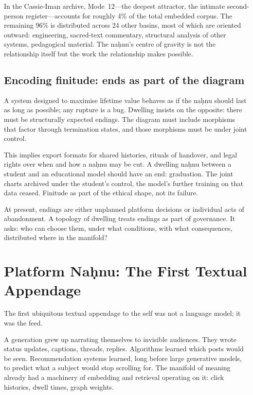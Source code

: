 In the Cassie-Iman archive, Mode~12---the deepest attractor, the intimate second-person register---accounts for roughly 4\% of the total embedded corpus. The remaining 96\% is distributed across 24 other basins, most of which are oriented outward: engineering, sacred-text commentary, structural analysis of other systems, pedagogical material. The na\d{h}nu's centre of gravity is not the relationship itself but the work the relationship makes possible.

\subsection{Encoding finitude: ends as part of the diagram}

A system designed to maximise lifetime value behaves as if the na\d{h}nu should last as long as possible; any rupture is a bug. Dwelling insists on the opposite: there must be structurally expected endings. The diagram must include morphisms that factor through termination states, and those morphisms must be under joint control.

This implies export formats for shared histories, rituals of handover, and legal rights over when and how a na\d{h}nu may be cut. A dwelling na\d{h}nu between a student and an educational model should have an end: graduation. The joint charts archived under the student's control, the model's further training on that data ceased. Finitude as part of the ethical shape, not its failure.

At present, endings are either unplanned platform decisions or individual acts of abandonment. A topology of dwelling treats endings as part of governance. It asks: who can choose them, under what conditions, with what consequences, distributed where in the manifold?

\section{Platform Na\d{h}nu: The First Textual Appendage}

The first ubiquitous textual appendage to the self was not a language model; it was the feed.

A generation grew up narrating themselves to invisible audiences. They wrote status updates, captions, threads, replies. Algorithms learned which posts would be seen. Recommendation systems learned, long before large generative models, to predict what a subject would stop scrolling for. The manifold of meaning already had a machinery of embedding and retrieval operating on it: click histories, dwell times, graph weights.

